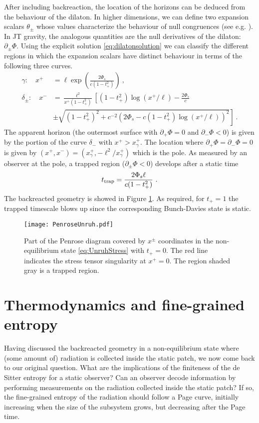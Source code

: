 \documentclass[a4paper,11pt]{article}
\newcommand{\beq}{\begin{equation}}
\newcommand{\eeq}{\end{equation}}
\newcommand{\bal}{\begin{aligned}}
\newcommand{\eal}{\end{aligned}}
\numberwithin{equation}{section}
\begin{document}
After including backreaction, the location of the horizons can be deduced from the behaviour of the dilaton. In higher dimensions, we can define two expansion scalars $\theta_\pm$ whose values characterize the behaviour of null congruences (see e.g. \cite{Poisson:2009pwt}). In JT gravity, the analogous quantities are the null derivatives of the dilaton: $\partial_\pm\Phi$. Using the explicit solution \eqref{eq:dilatonsolution} we can classify the different regions in which the expansion scalars have distinct behaviour in terms of the following three curves.
\beq
\bal
\gamma: \quad x^+ &= \ell \exp\left(\frac{2\Phi_s}{c(1-t_+^2)}\right) ~, \\
\delta_\pm:\quad x^-&= \frac{\ell^2}{x^+(1-t_+^2)}\left[(1-t_+^2)\log(x^+/\ell)-\frac{2\Phi_s}{c} \right. \\
&\left.\pm \sqrt{(1-t_+^2)^2 +c^{-2}\left(2\Phi_s-c(1-t_{+}^2)\log(x^+/\ell)\right)^2 } \right] ~.
\eal
\eeq
The apparent horizon (the outermost surface with $\partial_+\Phi=0$ and $\partial_-\Phi<0$) is given by the portion of the curve $\delta_-$ with $x^+>x^+_{\gamma}$. The location where  $\partial_+\Phi=\partial_-\Phi=0$ is given by $(x^+,x^-)=(x^+_{\gamma},-\ell^2/x^+_{\gamma})$ which is the pole. As measured by an observer at the pole, a trapped region ($\partial_\pm \Phi <0$) develops after a static time
\beq \label{eq:trapscale}
t_{\rm trap} = \frac{2\Phi_s\ell}{c(1-t_+^2)} ~.
\eeq
The backreacted geometry is showed in Figure  \ref{fig:PenroseUnruh}. As required, for $t_{+}=1$ the trapped timescale blows up since the corresponding Bunch-Davies state is static.
%
\begin{figure}[h]
\centering
\texttt{[image: PenroseUnruh.pdf]}
\caption{Part of the Penrose diagram covered by $x^\pm$ coordinates in the non-equilibrium state \eqref{eq:UnruhStress} with $t_+=0$. The red line indicates the stress tensor singularity at $x^+=0$. The region shaded gray is a trapped region.}
\label{fig:PenroseUnruh}
\end{figure}


\section{Thermodynamics and fine-grained entropy} \label{sec:entropy}
%
Having discussed the backreacted geometry in a non-equilibrium state where (some amount of) radiation is collected inside the static patch, we now come back to our original question. What are the implications of the finiteness of the de Sitter entropy for a static observer? 
Can an observer decode information by performing measurements on the radiation collected inside the static patch? If so, the fine-grained entropy of the radiation should follow a Page curve, initially increasing when the size of the subsystem grows, but decreasing after the Page time.
\end{document}
